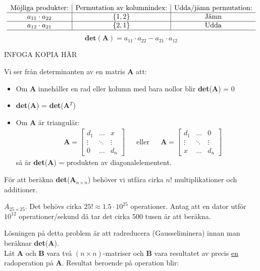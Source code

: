 \[
\begin{array}{c|c|c}
	\mbox{Möjliga produkter:} & \mbox{Permutation av kolumnindex:} & \mbox{Udda/jämn permutation:}\\\hline
	a_{11} \cdot a_{22} & \{1,2\} & \mbox{Jämn} \\\hline
	a_{12} \cdot a_{21} & \{2,1\} & \mbox{Udda}\\\hline
\end{array}
\]
\[
    \mathbf{det}(\mathbf{A}) = a_{11} \cdot a_{22} - a_{21} \cdot a_{12}
\]
\begin{Ex}
    \begin{center}
    	INFOGA KOPIA HÄR	
    \end{center}
\end{Ex}
Vi ser från determinanten av en matris \textbf{A} att:
\begin{itemize}
	\item Om \textbf{A} innehåller en rad eller kolumn med bara nollor blir \textbf{det}(\textbf{A}) = 0
	\item \textbf{det}(\textbf{A}) = \textbf{det}(\textbf{A}$^T$)
	\item Om \textbf{A} är triangulär:
	\begin{align*}
	&&	\mathbf{A} = 
	    \begin{bmatrix}
	    d_1 & ... & x\\
	    \vdots & \ddots & \vdots\\
	    0 & ... & d_n
	    \end{bmatrix}
	&&\mbox{eller}
	&& 	\mathbf{A} = 
	    \begin{bmatrix}
	    d_1 & ... & 0\\
	    \vdots & \ddots & \vdots\\
	    x & ... & d_n
	    \end{bmatrix}
	\end{align*}
	så är \textbf{det}(\textbf{A}) = produkten av diagonalelementent.
\end{itemize}
För att beräkna \textbf{det}(\textbf{A}$_{n \times n}$) behöver vi utfära cirka $n!$ multiplikationer och additioner.
\begin{Ex}
    $A_{25 \times 25}$. Det behövs cirka $25! \approx 1.5 \cdot 10^{25}$ operationer. Antag att en dator utför $10^{12}$ operationer/sekund då tar det cirka 500 tusen år att beräkna.
\end{Ex}
Lösningen på detta problem är att radreducera (Gausseliminera) innan man beräknar \textbf{det}(\textbf{A}).\\
Låt \textbf{A} och \textbf{B} vara två $(n \times n)$-matriser och \textbf{B} vara resultatet av precis \underline{en} radoperation på \textbf{A}. Resultat beroende på operation blir:

